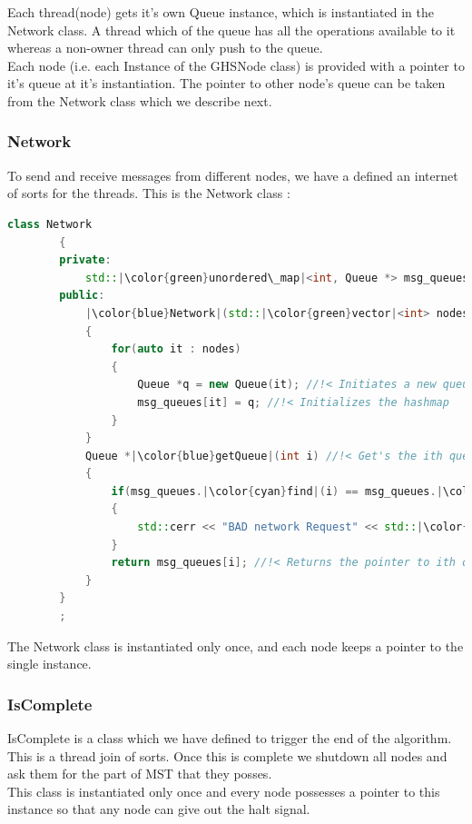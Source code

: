 \documentclass[letterpaper,11pt]{article}
\begin{document}
	Each thread(node) gets it's own Queue instance, which is instantiated in the Network class. A thread which of the queue has all the operations available to it whereas a non-owner thread can only {\color{cyan}push} to the queue. \\
	
	Each node (i.e. each Instance of the GHSNode class) is provided with a pointer to it's queue at it's instantiation. The pointer to other node's queue can be taken from the Network class which we describe next.
		
	\subsubsection{Network}
	
	To send and receive messages from different nodes, we have a defined an internet of sorts for the threads. This is the {\sc Network} class : \\
	
	\begin{lstlisting}[language=C++, caption= Network]
		class Network
		{
		private:
			std::|\color{green}unordered\_map|<int, Queue *> msg_queues; //!< Network queues
		public:
			|\color{blue}Network|(std::|\color{green}vector|<int> nodes) //!< Network Constructor 
			{
				for(auto it : nodes)
				{
					Queue *q = new Queue(it); //!< Initiates a new queue
					msg_queues[it] = q; //!< Initializes the hashmap
				}
			}
			Queue *|\color{blue}getQueue|(int i) //!< Get's the ith queue
			{
				if(msg_queues.|\color{cyan}find|(i) == msg_queues.|\color{cyan}end|())
				{
					std::cerr << "BAD network Request" << std::|\color{cyan}endl|;
				}
				return msg_queues[i]; //!< Returns the pointer to ith queue
			}
		}
		;
	\end{lstlisting}
	
	The {\sc Network} class is instantiated only once, and each node keeps a pointer to the single instance.  
	
	\subsubsection{IsComplete}
	
	{\sc IsComplete} is a class which we have defined to trigger the end of the algorithm. This is a thread join of sorts. Once this is complete we shutdown all nodes and ask them for the part of MST that they posses. \\
	
	This class is instantiated only once and every node possesses a pointer to this instance so that any node can give out the halt signal.
	
\end{document}
